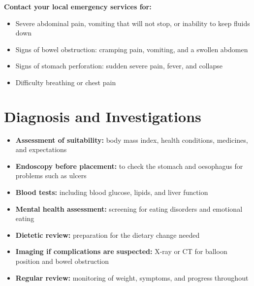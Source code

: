 \textbf{Contact your local emergency services for:}
\begin{itemize}
    \item Severe abdominal pain, vomiting that will not stop, or inability to keep fluids down
    \item Signs of bowel obstruction: cramping pain, vomiting, and a swollen abdomen
    \item Signs of stomach perforation: sudden severe pain, fever, and collapse
    \item Difficulty breathing or chest pain
\end{itemize}

\section*{Diagnosis and Investigations}
\begin{itemize}
    \item \textbf{Assessment of suitability:} body mass index, health conditions, medicines, and expectations
    \item \textbf{Endoscopy before placement:} to check the stomach and oesophagus for problems such as ulcers
    \item \textbf{Blood tests:} including blood glucose, lipids, and liver function
    \item \textbf{Mental health assessment:} screening for eating disorders and emotional eating
    \item \textbf{Dietetic review:} preparation for the dietary change needed
    \item \textbf{Imaging if complications are suspected:} X-ray or CT for balloon position and bowel obstruction
    \item \textbf{Regular review:} monitoring of weight, symptoms, and progress throughout
\end{itemize}

